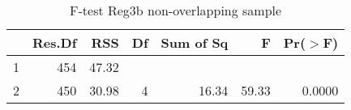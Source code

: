 \begin{table}[htbp!]
\centering
\caption{F-test Reg3b non-overlapping sample} 
\label{tab:ftest2over}
\begin{tabular}{lrrrrrr}
  \hline
 & Res.Df & RSS & Df & Sum of Sq & F & Pr($>$F) \\ 
  \hline
1 & 454 & 47.32 &  &  &  &  \\ 
  2 & 450 & 30.98 & 4 & 16.34 & 59.33 & 0.0000 \\ 
   \hline
\end{tabular}
\end{table}

